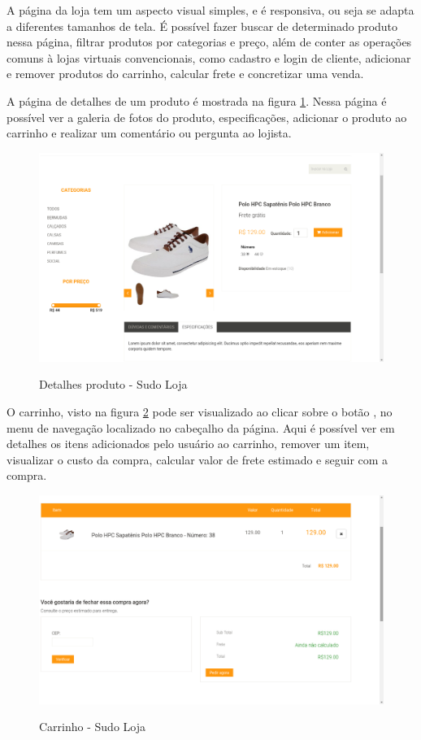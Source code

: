 \documentclass[a4paper,12pt]{monografia}
\begin{document}
A página da loja tem um aspecto visual simples, e é responsiva, ou seja se adapta a diferentes tamanhos de tela. É possível fazer buscar de determinado produto nessa página, filtrar produtos por categorias e preço, além  de conter as operações comuns à lojas virtuais convencionais, como cadastro e login de cliente, adicionar e remover produtos do carrinho, calcular frete e concretizar uma venda.

A página de detalhes de um produto é mostrada na figura \ref{fig:detalhesproduto}. Nessa página é possível ver a galeria de fotos do produto, especificações, adicionar o produto ao carrinho e realizar um comentário ou pergunta ao lojista.

\begin{figure}[H]
\centering
\caption{Detalhes produto - Sudo Loja}
\centering
\includegraphics[width=15cm]{img/sistema/produto.png.eps}\\
\label{fig:detalhesproduto}
\end{figure}

O carrinho, visto na figura \ref{fig:carrinho} pode ser visualizado ao clicar sobre o botão , no menu de navegação localizado no cabeçalho da página. Aqui é possível ver em detalhes os itens adicionados pelo usuário ao carrinho, remover um item, visualizar o custo da compra, calcular valor de frete estimado e seguir com a compra.

\begin{figure}[H]
\centering
\caption{Carrinho - Sudo Loja}
\centering
\includegraphics[width=15cm]{img/sistema/cart.png.eps}\\
\label{fig:carrinho}
\end{figure}
\end{document}
